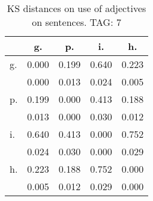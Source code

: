 \begin{table}[h!]
\begin{center}
\begin{tabular}{| l | c | c | c | c |}\hline
 & g. & p. & i. & h. \\\hline
g. & 0.000  & 0.199  & 0.640  & 0.223 \\\hline
 & 0.000  & 0.013  & 0.024  & 0.005 \\\hline
p. & 0.199  & 0.000  & 0.413  & 0.188 \\\hline
 & 0.013  & 0.000  & 0.030  & 0.012 \\\hline
i. & 0.640  & 0.413  & 0.000  & 0.752 \\\hline
 & 0.024  & 0.030  & 0.000  & 0.029 \\\hline
h. & 0.223  & 0.188  & 0.752  & 0.000 \\\hline
 & 0.005  & 0.012  & 0.029  & 0.000 \\\hline
\end{tabular}
\caption{KS distances on use of adjectives on sentences. TAG: 7}
\end{center}
\end{table}